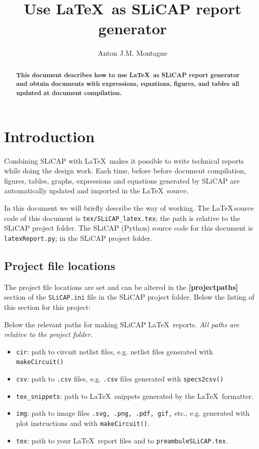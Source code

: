 \documentclass[a4paper,12pt]{article}
\title{Use \LaTeX$\,$ as SLiCAP report generator}
\author{Anton J.M. Montagne}
\begin{document}
\maketitle
\tableofcontents
\newpage
\begin{abstract}
{\textbf{This document describes how to use \LaTeX$\,$ as SLiCAP report generator and
obtain documents with expressions, equations, figures, and tables all updated at document compilation.}}
\end{abstract}
\newpage

\section{Introduction}
Combining SLiCAP with \LaTeX$\,$ makes it possible to write technical reports while doing the design work.
Each time, before before document compilation, figures, tables, graphs, expressions and equations generated by SLiCAP are automatically updated and imported in the \LaTeX$\,$ source.

In this document we will briefly describe the way of working. The \LaTeX$\,$source code of this document is {\texttt{tex/SLiCAP\_latex.tex}}; the path is relative to the SLiCAP project folder. The SLiCAP (Python) source code for this document is {\texttt{latexReport.py}}; in the SLiCAP project folder.

\subsection{Project file locations}\label{sec-project}

The project file locations are set and can be altered in the {\textbf{[projectpaths]}} section of the {\texttt{SLiCAP.ini}} file in the SLiCAP project folder. Below the listing of this section for this project:



Below the relevant paths for making SLiCAP \LaTeX$\,$ reports. {\em{All paths are relative to the project folder.}}

\begin{itemize}
 \item {\texttt{cir}}: path to circuit netlist files, e.g. netlist files generated with {\texttt{makeCircuit()}}
 \item {\texttt{csv}}: path to {\texttt{.csv}} files, e.g. {\texttt{.csv}} files generated with {\texttt{specs2csv()}}
 \item {\texttt{tex\_snippets}}: path to \LaTeX$\,$ snippets generated by the \LaTeX$\,$ formatter.
 \item {\texttt{img}}: path to image files {\texttt{.svg, .png, .pdf, gif,} etc.}, e.g. generated with plot instructions and with {\texttt{makeCircuit()}}.
 \item {\texttt{tex}}: path to your \LaTeX$\,$ report files and to {\texttt{preambuleSLiCAP.tex}}.
\end{itemize}
\end{document}
